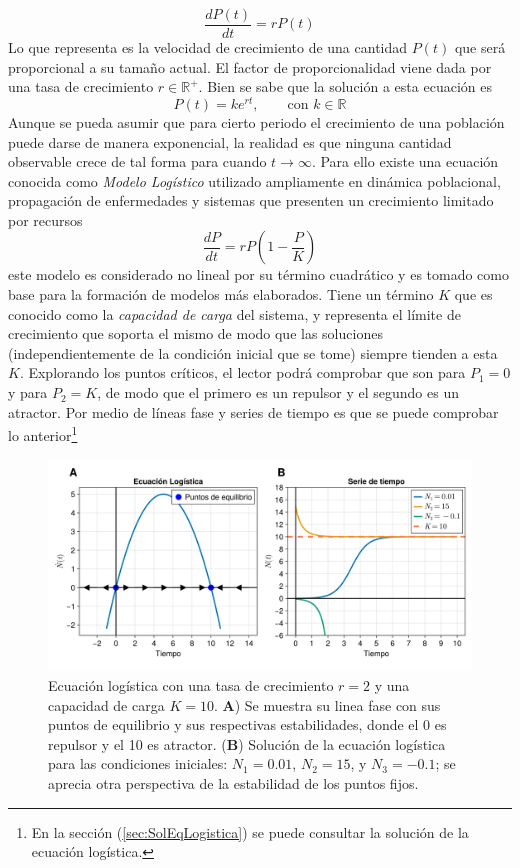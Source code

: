 \begin{equation}\label{eqn:CrecimientoExponencial}
	\frac{dP(t)}{dt}=rP(t)
\end{equation}
Lo que representa es la velocidad de crecimiento de una cantidad $P(t)$ que será proporcional a su tamaño actual. El factor de proporcionalidad viene dada por una tasa de crecimiento $r\in\mathbb{R}^+$. Bien se sabe que la solución a esta ecuación es 
$$P(t)=ke^{rt},\qquad\text{con }k\in\mathbb{R}$$
\newpage Aunque se pueda asumir que para cierto periodo el crecimiento de una población puede darse de manera exponencial, la realidad es que ninguna cantidad observable crece de tal forma para cuando $t\to\infty$. Para ello existe una ecuación conocida como \textit{Modelo Logístico} utilizado ampliamente en dinámica poblacional, propagación de enfermedades y sistemas que presenten un crecimiento limitado por recursos
\begin{equation}\label{eqn:EqLogistica}
	\frac{dP}{dt}=rP\left (1-\frac{P}{K}\right )
\end{equation}
este modelo es considerado no lineal por su término cuadrático y es tomado como base para la formación de modelos más elaborados. Tiene un término $K$ que es conocido como la \textit{capacidad de carga} del sistema, y representa el límite de crecimiento que soporta el mismo de modo que las soluciones (independientemente de  la condición inicial que se tome) siempre tienden a esta $K$. Explorando los puntos críticos, el lector podrá comprobar que son para $P_1=0$ y para $P_2=K$, de modo que el primero es un repulsor y el segundo es un atractor. Por medio de líneas fase y series de tiempo es que se puede comprobar lo anterior\footnote{En la sección (\ref{sec:SolEqLogistica}) se puede consultar la solución de la ecuación logística.}
\begin{figure}[h!]
	\centering
	\includegraphics[scale=0.23]{../Imagenes/Ecuacion Logistica}
	\caption{Ecuación logística con una tasa de crecimiento $r=2$ y una capacidad de carga $K=10$. \textbf{A}) Se muestra su linea fase con sus puntos de equilibrio y sus respectivas estabilidades, donde el 0 es repulsor y el 10 es atractor. (\textbf{B}) Solución de la ecuación logística para las condiciones iniciales: $N_1=0.01$, $N_2=15$, y $N_3=-0.1$; se aprecia otra perspectiva de la estabilidad de los puntos fijos.}
	\label{fig:EcuacionLogistica}
\end{figure}		
